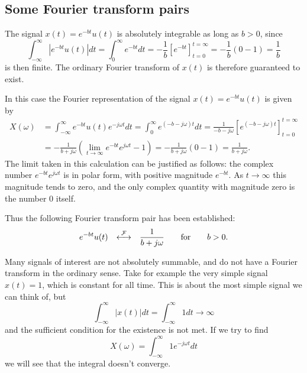 \documentclass[10pt]{beamer}
\newcommand{\ftpair}{{\stackrel{\cal F}{\longleftrightarrow}}}
\begin{document}
\subsection{Some Fourier transform pairs}

The signal $x(t) = e^{-b t} u(t)$ is absolutely integrable as long as $b>0$, since
\begin{equation*}
  \int_{-\infty}^{\infty} |e^{-b t} u(t)| dt = \int_0^{\infty} e^{-b t} dt
  = -\frac{1}{b} \left[ e^{-b t} \right]_{t=0}^{t=\infty} 
  = -\frac{1}{b} (0 - 1) = \frac{1}{b}
\end{equation*}
is then finite.  The ordinary Fourier transform of $x(t)$ is therefore guaranteed to exist.

In this case the Fourier representation of the signal $x(t) = e^{-b t} u(t)$ is given by
\begin{align*}
  X(\omega) &= \int_{-\infty}^{\infty} e^{-bt} u(t) e^{-j \omega t} dt
  = \int_{0}^{\infty} e^{(-b - j \omega) t} dt
  = \frac{1}{-b - j \omega} \left[ e^{(-b - j \omega) t} \right]_{t=0}^{t=\infty} \\
  &= - \frac{1}{b + j \omega} \left( \lim_{t \to \infty} e^{-bt} e^{j \omega t} - 1\right)
  = - \frac{1}{b + j \omega} \left( 0 - 1\right)
  = \frac{1}{b + j \omega}.
\end{align*}
The limit taken in this calculation can be justified as follows:  the complex number $e^{-bt} e^{j \omega t}$ is in polar form, with positive magnitude $e^{-bt}$.  As $t \to \infty$ this magnitude tends to zero, and the only complex quantity with magnitude zero is the number 0 itself.

Thus the following Fourier transform pair has been established:
\begin{equation*}
  e^{-bt} u(t) \quad \ftpair \quad \frac{1}{b + j \omega} \qquad \text{for} \qquad b>0.
\end{equation*}

Many signals of interest are not absolutely summable, and do not have a Fourier transform in the ordinary sense.  Take for example the very simple signal $x(t) = 1$, which is constant for all time.  This is about the most simple signal we can think of, but
\begin{equation*}
  \int_{-\infty}^{\infty} |x(t)| dt = \int_{-\infty}^{\infty} 1 dt \to \infty
\end{equation*}
and the sufficient condition for the existence is not met.  If we try to find
\begin{equation*}
  X(\omega) = \int_{-\infty}^{\infty} 1 e^{-j \omega t} dt
\end{equation*}
we will see that the integral doesn't converge.
\end{document}
